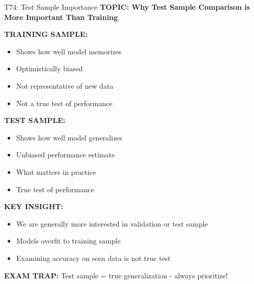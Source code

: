 \documentclass[8pt]{beamer}
\begin{document}
	\begin{frame}{T74: Test Sample Importance}
		\fontsize{6.5}{7.5}\selectfont
		\textbf{TOPIC: Why Test Sample Comparison is More Important Than Training}
		
		\vspace{0.1cm}
		\textbf{TRAINING SAMPLE:}
		\begin{itemize}
			\item Shows how well model memorizes
			\item Optimistically biased
			\item Not representative of new data
			\item Not a true test of performance
		\end{itemize}
		
		\vspace{0.1cm}
		\textbf{TEST SAMPLE:}
		\begin{itemize}
			\item Shows how well model generalizes
			\item Unbiased performance estimate
			\item What matters in practice
			\item True test of performance
		\end{itemize}
		
		\vspace{0.1cm}
		\textbf{KEY INSIGHT:}
		\begin{itemize}
			\item We are generally more interested in validation or test sample
			\item Models overfit to training sample
			\item Examining accuracy on seen data is not true test
		\end{itemize}
		
		\textcolor{myred}{\textbf{EXAM TRAP:}} Test sample = \textcolor{myblue}{true generalization} - always prioritize!
	\end{frame}
	
\end{document}
